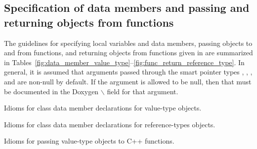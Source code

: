%
{}\subsection{Specification of data members and passing and returning
objects from functions}
\label{sec:func_arguments}
%

The guidelines for specifying local variables and data members,
passing objects to and from functions, and returning objects from
functions given in {}\cite{TeuchosMemoryManagementGuide} are
summarized in
Tables~\ref{fig:data_member_value_type}--\ref{fig:func_return_reference_type}.
In general, it is assumed that arguments passed through the smart
pointer types {}, {}, {}, and
{} are non-null by default.  If the argument is allowed
to be null, then that must be documented in the Doxygen
$\backslash$ field for that argument.


\begin{table}
%
\begin{center}
%
%

%
%
\end{center}
\caption{\label{fig:data_member_value_type}
Idioms for class data member declarations for value-type objects.}
%
\end{table}


\begin{table}
%
\begin{center}
%
%

%
%
\end{center}
\caption{\label{fig:data_member_reference_type}
Idioms for class data member declarations for reference-types
objects.}
%
\end{table}


\begin{table}[p]
%
\begin{center}
%
%

%
%
%
\end{center}
\caption{\label{fig:func_args_value_type}
Idioms for passing value-type objects to C++ functions.}
%
\end{table}


